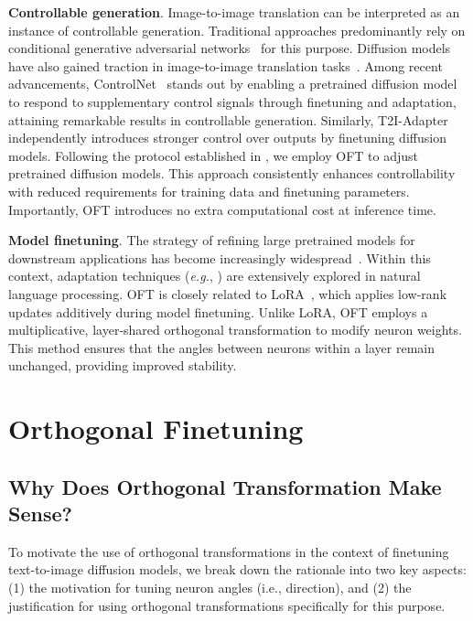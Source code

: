 \textbf{Controllable generation}. Image-to-image translation can be interpreted as an instance of controllable generation. Traditional approaches predominantly rely on conditional generative adversarial networks~\cite{isola2017image,zhu2017toward,wang2018high,park2019semantic,choi2018stargan} for this purpose. Diffusion models have also gained traction in image-to-image translation tasks~\cite{saharia2022palette,voynov2022sketch,wang2022pretraining}. Among recent advancements, ControlNet~\cite{zhang2023adding} stands out by enabling a pretrained diffusion model to respond to supplementary control signals through finetuning and adaptation, attaining remarkable results in controllable generation. Similarly, T2I-Adapter~\cite{mou2023t2i} independently introduces stronger control over outputs by finetuning diffusion models. Following the protocol established in \cite{zhang2023adding,mou2023t2i}, we employ OFT to adjust pretrained diffusion models. This approach consistently enhances controllability with reduced requirements for training data and finetuning parameters. Importantly, OFT introduces no extra computational cost at inference time.

\textbf{Model finetuning}. The strategy of refining large pretrained models for downstream applications has become increasingly widespread~\cite{devlin2018bert,brown2020language,he2022masked}. Within this context, adaptation techniques (\emph{e.g.}, \cite{hulora2022,houlsby2019parameter,pfeiffer2020adapterfusion}) are extensively explored in natural language processing. OFT is closely related to LoRA~\cite{hulora2022}, which applies low-rank updates additively during model finetuning. Unlike LoRA, OFT employs a multiplicative, layer-shared orthogonal transformation to modify neuron weights. This method ensures that the angles between neurons within a layer remain unchanged, providing improved stability.

\section{Orthogonal Finetuning}

\subsection{Why Does Orthogonal Transformation Make Sense?}

To motivate the use of orthogonal transformations in the context of finetuning text-to-image diffusion models, we break down the rationale into two key aspects: (1) the motivation for tuning neuron angles (i.e., direction), and (2) the justification for using orthogonal transformations specifically for this purpose.

